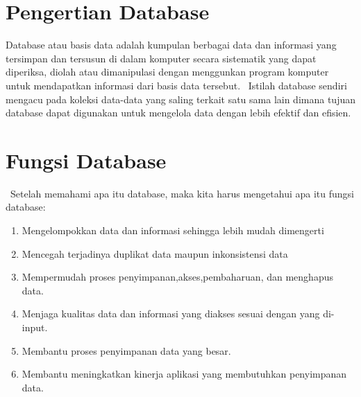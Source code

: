 \section{Pengertian Database}
\hfill \break
Database atau basis data adalah kumpulan berbagai data dan informasi yang tersimpan dan tersusun di dalam komputer secara sistematik yang dapat diperiksa, diolah atau dimanipulasi dengan menggunkan program komputer untuk mendapatkan informasi dari basis data tersebut. 
\hfill \break\
Istilah database sendiri mengacu pada koleksi data-data yang saling terkait satu sama lain dimana tujuan database dapat digunakan untuk mengelola data dengan lebih efektif dan efisien. 
\section{Fungsi Database}
\hfill \break\
Setelah memahami apa itu database, maka kita harus mengetahui apa itu fungsi database:
\begin{enumerate}
\item Mengelompokkan data dan informasi sehingga lebih mudah dimengerti
\item Mencegah terjadinya duplikat data maupun inkonsistensi data
\item Mempermudah proses penyimpanan,akses,pembaharuan, dan menghapus data.
\item Menjaga kualitas data dan informasi yang diakses sesuai dengan yang di-input.
\item Membantu proses penyimpanan data yang besar.
\item Membantu meningkatkan kinerja aplikasi yang membutuhkan penyimpanan data.
\end{enumerate}
